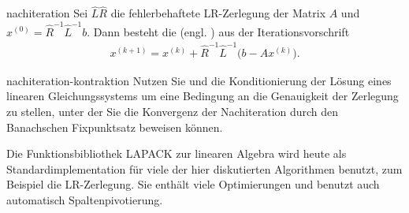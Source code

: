 \begin{Definition}{nachiteration}
  Sei $\widehat L\widehat R$ die fehlerbehaftete LR-Zerlegung der Matrix $A$
  und $x^{(0)} = \widehat R^{-1}\widehat L^{-1} b$. Dann besteht die
   (engl. ) aus der
  Iterationsvorschrift
  \begin{gather}
    x^{(k+1)} = x^{(k)} + \widehat R^{-1}\widehat L^{-1}
    \bigl(b-Ax^{(k)}\bigr).
  \end{gather}
\end{Definition}

\begin{Aufgabe}{nachiteration-kontraktion}
  Nutzen Sie  und die Konditionierung der
  Lösung eines linearen Gleichungssystems um eine Bedingung an die
  Genauigkeit der Zerlegung zu stellen, unter der Sie die Konvergenz
  der Nachiteration durch den Banachschen Fixpunktsatz beweisen
  können.
\end{Aufgabe}

\begin{remark}
  Die Funktionsbibliothek LAPACK zur linearen Algebra wird heute als
  Standardimplementation für viele der hier diskutierten Algorithmen
  benutzt, zum Beispiel die LR-Zerlegung. Sie enthält viele
  Optimierungen und benutzt auch automatisch Spaltenpivotierung.
\end{remark}



